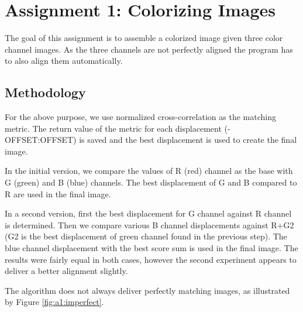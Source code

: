 \section{Assignment 1: Colorizing Images}
\label{sec:assignment1}

The goal of this assignment is to assemble a colorized image given three color channel images. As the three channels are not perfectly aligned the program has to also align them automatically.


\subsection{Methodology}

For the above purpose, we use normalized cross-correlation as the matching metric. The return value of the metric for each displacement (-OFFSET:OFFSET) is saved and the best displacement is used to create the final image.

In the initial version, we compare the values of R (red) channel as the base with G (green) and B (blue) channels. The best displacement of G and B compared to R are used in the final image.

In a second version, first the best displacement for G channel against R channel is determined. Then we compare various B channel displacements against R+G2 (G2 is the best displacement of green channel found in the previous step). The blue channel displacement with the best score sum is used in the final image.
The results were fairly equal in both cases, however the second experiment appears to deliver a better alignment slightly.

The algorithm does not always deliver perfectly matching images, as illustrated by Figure \ref{fig:a1:imperfect}.

